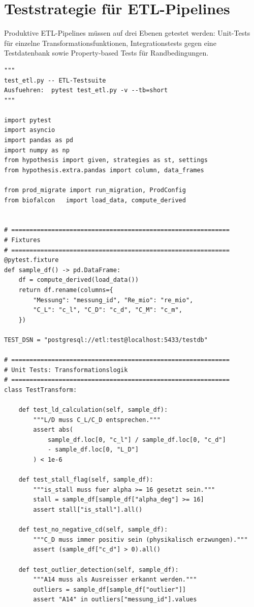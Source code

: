 \documentclass[12pt,a4paper]{report}
\theoremstyle{definition}
\theoremstyle{remark}
\begin{document}
\section{Teststrategie für ETL-Pipelines}

Produktive ETL-Pipelines müssen auf drei Ebenen getestet werden:
Unit-Tests für einzelne Transformationsfunktionen,
Integrationstests gegen eine Testdatenbank sowie
Property-based Tests für Randbedingungen.

\begin{lstlisting}[style=python, caption={test\_etl.py: Vollständige Testsuite mit pytest und hypothesis}]
"""
test_etl.py -- ETL-Testsuite
Ausfuehren:  pytest test_etl.py -v --tb=short
"""

import pytest
import asyncio
import pandas as pd
import numpy as np
from hypothesis import given, strategies as st, settings
from hypothesis.extra.pandas import column, data_frames

from prod_migrate import run_migration, ProdConfig
from biofalcon   import load_data, compute_derived


# ============================================================
# Fixtures
# ============================================================
@pytest.fixture
def sample_df() -> pd.DataFrame:
    df = compute_derived(load_data())
    return df.rename(columns={
        "Messung": "messung_id", "Re_mio": "re_mio",
        "C_L": "c_l", "C_D": "c_d", "C_M": "c_m",
    })

TEST_DSN = "postgresql://etl:test@localhost:5433/testdb"

# ============================================================
# Unit Tests: Transformationslogik
# ============================================================
class TestTransform:

    def test_ld_calculation(self, sample_df):
        """L/D muss C_L/C_D entsprechen."""
        assert abs(
            sample_df.loc[0, "c_l"] / sample_df.loc[0, "c_d"]
            - sample_df.loc[0, "L_D"]
        ) < 1e-6

    def test_stall_flag(self, sample_df):
        """is_stall muss fuer alpha >= 16 gesetzt sein."""
        stall = sample_df[sample_df["alpha_deg"] >= 16]
        assert stall["is_stall"].all()

    def test_no_negative_cd(self, sample_df):
        """C_D muss immer positiv sein (physikalisch erzwungen)."""
        assert (sample_df["c_d"] > 0).all()

    def test_outlier_detection(self, sample_df):
        """A14 muss als Ausreisser erkannt werden."""
        outliers = sample_df[sample_df["outlier"]]
        assert "A14" in outliers["messung_id"].values



\end{lstlisting}
\end{document}
